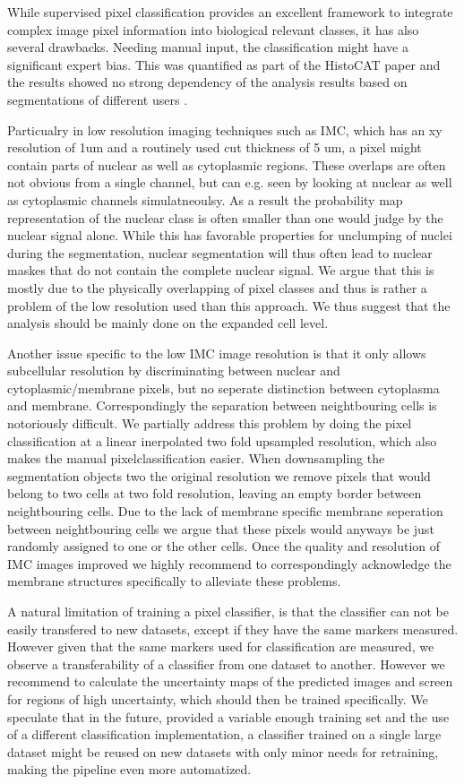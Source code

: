 \documentclass[a4paper]{article}
\begin{document}
While supervised pixel classification provides an excellent framework to integrate complex image
pixel information into biological relevant classes, it has also several drawbacks. Needing manual
input, the classification  might have a significant expert bias. This was quantified as part of the
HistoCAT paper and the results showed no strong dependency of the analysis results based on
segmentations of different users \cite{schapiro_histocat:_2017}.

Particualry in low resolution imaging techniques such as IMC, which has an xy resolution of 1um and
a routinely used cut thickness of 5 um, a pixel might contain parts of nuclear as well as
cytoplasmic regions. These overlaps are often not obvious from a single channel, but can e.g. seen
by looking at nuclear as well as cytoplasmic channels simulatneoulsy. As a result the probability
map representation of the nuclear class is often smaller than one would judge by the nuclear signal
alone. While this has favorable properties for unclumping of nuclei during the segmentation, nuclear
segmentation will thus often lead to nuclear maskes that do not contain
the complete nuclear signal. We argue that this is mostly due to the physically overlapping of
pixel classes and thus is rather a problem of the low resolution used than this approach. We thus
suggest that the analysis should be mainly done on the expanded cell level.

Another issue specific to the low IMC image resolution is that it only allows subcellular
resolution by discriminating
between nuclear and cytoplasmic/membrane pixels, but no seperate distinction between cytoplasma and
membrane. Correspondingly the separation between neightbouring cells is notoriously difficult. We
partially address this problem by doing the pixel classification at a linear inerpolated two fold
upsampled resolution, which also makes the manual pixelclassification easier. When downsampling the
segmentation objects two the original resolution we remove pixels that would belong to two cells at
two fold resolution, leaving an empty border between neightbouring cells. Due to the lack of
membrane specific membrane seperation between neightbouring cells we argue that these pixels would
anyways be just randomly assigned to one or the other cells. Once the quality and resolution of IMC
images improved we highly recommend to correspondingly acknowledge the membrane structures
specifically to alleviate these problems.

A natural limitation of training a pixel classifier, is that the classifier can not be easily
transfered to new datasets, except if they have the same markers measured. However given that the
same markers used for classification are measured, we observe a transferability of a classifier
from one dataset to another. However we recommend to calculate the uncertainty maps of the predicted
images and screen for regions of high uncertainty, which should then be trained specifically. 
We speculate that in the future, provided a variable enough training
set and the use of a different classification implementation, a classifier trained on a single large dataset might be reused on new datasets with only minor
needs for retraining, making the pipeline even more automatized.
\end{document}
